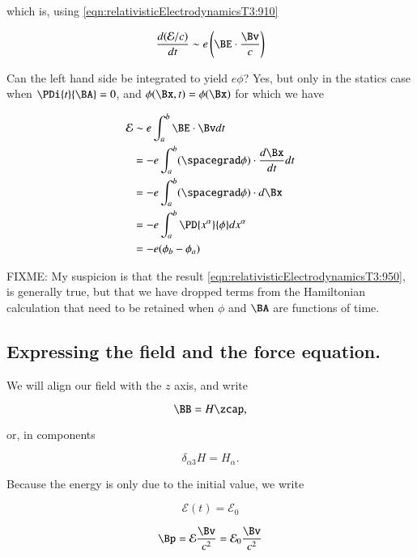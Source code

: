 which is, using \ref{eqn:relativisticElectrodynamicsT3:910}

\begin{equation}\label{eqn:relativisticElectrodynamicsT3:950}
\frac{d(\mathcal{E}/c)}{dt} \sim e \left(\BE \cdot \frac{\Bv}{c}\right) 
\end{equation}

Can the left hand side be integrated to yield $e \phi$?  Yes, but only in the statics case when $\PDi{t}{\BA} = 0$, and $\phi(\Bx,t) = \phi(\Bx)$ for which we have

\begin{align*}
\mathcal{E} 
&\sim e \int_a^b \BE \cdot \Bv dt \\
&= -e \int_a^b (\spacegrad \phi) \cdot \frac{d \Bx}{dt} dt \\
&= -e \int_a^b (\spacegrad \phi) \cdot d \Bx \\
&= -e \int_a^b \PD{x^\alpha}{\phi} d x^\alpha \\
&= -e (\phi_b - \phi_a)
\end{align*}

FIXME: My suspicion is that the result \ref{eqn:relativisticElectrodynamicsT3:950}, is generally true, but that we have dropped terms from the Hamiltonian calculation that need to be retained when $\phi$ and $\BA$ are functions of time.

\subsection{Expressing the field and the force equation.}

We will align our field with the $z$ axis, and write

\begin{equation}\label{eqn:relativisticElectrodynamicsT3:560}
\BB = H \zcap,
\end{equation}

or, in components

\begin{equation}\label{eqn:relativisticElectrodynamicsT3:580}
\delta_{\alpha 3} H = H_\alpha.
\end{equation}

Because the energy is only due to the initial value, we write

\begin{equation}\label{eqn:relativisticElectrodynamicsT3:540}
\mathcal{E}(t) = \mathcal{E}_0
\end{equation}

\begin{equation}\label{eqn:relativisticElectrodynamicsT3:600}
\Bp = \mathcal{E} \frac{\Bv}{c^2} = \mathcal{E}_0 \frac{\Bv}{c^2}
\end{equation}

